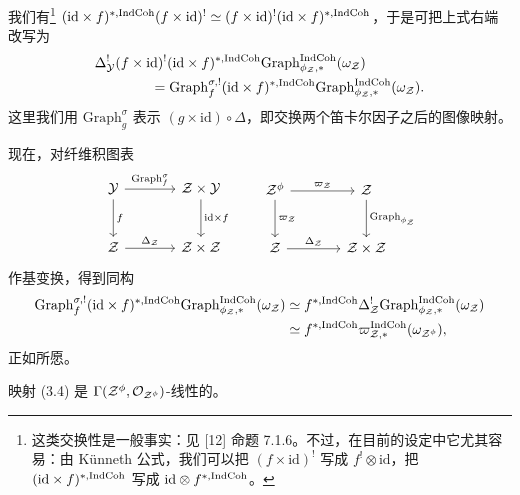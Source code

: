 我们有\footnote{这类交换性是一般事实：见 [12] 命题 7.1.6。不过，在目前的设定中它尤其容易：由 Künneth 公式，我们可以把 $(f \times \mathrm{id})^!$ 写成 $f^! \otimes \mathrm{id}$，把 $(\mathrm{id} \times f)^{*,\mathrm{IndCoh}}$ 写成 $\mathrm{id} \otimes f^{*,\mathrm{IndCoh}}$。}
$(\mathrm{id} \times f)^{*,\mathrm{IndCoh}}(f \times \mathrm{id})^! \simeq (f \times \mathrm{id})^!(\mathrm{id} \times f)^{*,\mathrm{IndCoh}}$，于是可把上式右端改写为
\[
  \begin{aligned}
    &\Delta^!_{\mathcal{Y}}(f \times \mathrm{id})^!(\mathrm{id} \times f)^{*,\mathrm{IndCoh}}
      \mathrm{Graph}^{\mathrm{IndCoh}}_{\phi_{\mathcal{Z}},*}(\omega_{\mathcal{Z}})\\
    &\qquad\qquad = \mathrm{Graph}^{\sigma,!}_f(\mathrm{id} \times f)^{*,\mathrm{IndCoh}}
      \mathrm{Graph}^{\mathrm{IndCoh}}_{\phi_{\mathcal{Z}},*}(\omega_{\mathcal{Z}}).
  \end{aligned}
\]
这里我们用 $\mathrm{Graph}^\sigma_g$ 表示 $(g \times \mathrm{id}) \circ \Delta$，即交换两个笛卡尔因子之后的图像映射。

现在，对纤维积图表
\[
  \begin{tikzcd}[column sep=large, row sep=large]
    \mathcal{Y} \arrow[r, "\mathrm{Graph}^\sigma_f"] \arrow[d, "f"]
      & \mathcal{Z} \times \mathcal{Y} \arrow[d, "\mathrm{id} \times f"] \\
    \mathcal{Z} \arrow[r, "\Delta_{\mathcal{Z}}"]
      & \mathcal{Z} \times \mathcal{Z}
  \end{tikzcd}
  \qquad
  \begin{tikzcd}[column sep=large, row sep=large]
    \mathcal{Z}^\phi \arrow[r, "\varpi_{\mathcal{Z}}"] \arrow[d, "\varpi_{\mathcal{Z}}"]
      & \mathcal{Z} \arrow[d, "\mathrm{Graph}_{\phi_{\mathcal{Z}}}"] \\
    \mathcal{Z} \arrow[r, "\Delta_{\mathcal{Z}}"]
      & \mathcal{Z} \times \mathcal{Z}
  \end{tikzcd}
\]
作基变换，得到同构
\[
  \begin{aligned}
    \mathrm{Graph}^{\sigma,!}_f(\mathrm{id} \times f)^{*,\mathrm{IndCoh}}
      \mathrm{Graph}^{\mathrm{IndCoh}}_{\phi_{\mathcal{Z}},*}(\omega_{\mathcal{Z}})
    &\simeq f^{*,\mathrm{IndCoh}}\Delta^!_{\mathcal{Z}}
      \mathrm{Graph}^{\mathrm{IndCoh}}_{\phi_{\mathcal{Z}},*}(\omega_{\mathcal{Z}})\\
    &\simeq f^{*,\mathrm{IndCoh}}\varpi^{\mathrm{IndCoh}}_{\mathcal{Z},*}(\omega_{\mathcal{Z}^\phi}),
  \end{aligned}
\]
正如所愿。

\begin{remark}
映射 (3.4) 是 $\Gamma(\mathcal{Z}^\phi, \mathcal{O}_{\mathcal{Z}^\phi})$-线性的。
\end{remark}

